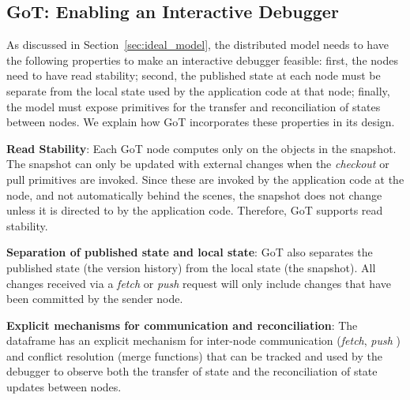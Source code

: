 \subsection{GoT: Enabling an Interactive Debugger}
\label{sec:meeting_constraints}

As discussed in Section~\ref{sec:ideal_model}, the distributed model needs to have the following properties to make an interactive debugger feasible: first, the nodes need to have read stability; second, the published state at each node must be separate from the local state used by the application code at that node; finally, the model must expose primitives for the transfer and reconciliation of states between nodes. We explain how GoT incorporates these properties in its design.

{\bf Read Stability}: Each GoT node computes only on the objects in the snapshot. The snapshot can only be updated with external changes when the {\em checkout} or pull primitives are invoked. Since these are invoked by the application code at the node, and not automatically behind the scenes, the snapshot does not change unless it is directed to by the application code. Therefore, GoT supports read stability.

{\bf Separation of published state and local state}: GoT also separates the published state (the version history) from the local state (the snapshot). All changes received via a {\em fetch} or {\em push}  request will only include changes that have been committed by the sender node. 

{\bf Explicit mechanisms for communication and reconciliation}: The dataframe has an explicit mechanism for inter-node communication ({\em fetch}, {\em push} ) and conflict resolution (merge functions) that can be tracked and used by the debugger to observe both the transfer of state and the reconciliation of state updates between nodes.
